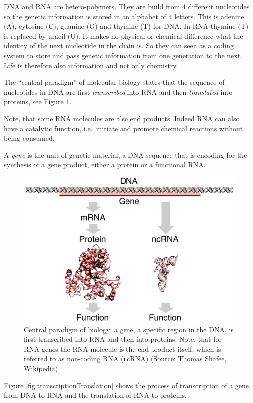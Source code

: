 \documentclass[
  11pt,
]{book}
\begin{document}
DNA and RNA are hetero-polymers. They are build from 4 different nucleotides so the genetic information is stored in an alphabet of 4 letters. This is
adenine (A), cytosine (C), guanine (G) and thymine (T) for DNA. In RNA thymine (T) is replaced by uracil (U).
It makes no physical or chemical difference what the identity of the next nucleotide in the chain is. So they can seen as a coding system to store and pass genetic information from one generation to the next. Life is therefore also information and not only chemistry.

The ``central paradigm'' of molecular biology states that the sequence of nucleotides in DNA are first \emph{transcribed} into RNA and then \emph{translated} into proteins, see Figure \ref{fig:centralParadigm}.

Note, that some RNA molecules are also end products. Indeed RNA can also have a catalytic function, i.e.~initiate and promote chemical reactions without being consumed.

A \emph{gene} is the unit of genetic material, a DNA sequence that is encoding for the synthesis of a gene product, either a protein or a functional RNA.

\begin{figure}

{\centering \includegraphics[width=0.5\linewidth]{./figs/gene} 

}

\caption{Central paradigm of biology: a gene, a specific region in the DNA, is first transcribed into RNA and then into proteins. Note, that for RNA-genes the RNA molecule is the end product itself, which is referred to as non-coding RNA (ncRNA) (Source: Thomas Shafee, Wikipedia)}\label{fig:centralParadigm}
\end{figure}

Figure \ref{fig:transcriptionTranslation} shows the process of transcription of a gene from DNA to RNA and the translation of RNA to proteins.
\end{document}
